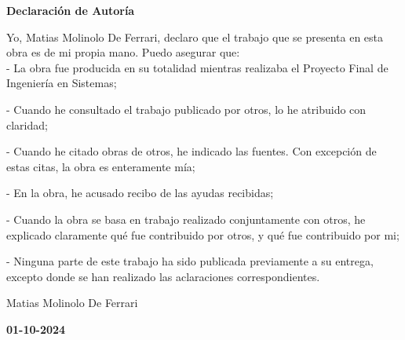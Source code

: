 {\huge\bfseries \space Declaración de Autoría}

\thispagestyle{empty}


\bigskip
\bigskip
Yo, Matias Molinolo De Ferrari, declaro que el trabajo que se presenta en esta obra es de mi propia mano. 
Puedo asegurar que:
\\

- La obra fue producida en su totalidad mientras realizaba el Proyecto Final de Ingeniería en Sistemas;


- Cuando he consultado el trabajo publicado por otros, lo he atribuido con claridad;


- Cuando he citado obras de otros, he indicado las fuentes. Con excepción de estas citas, la obra es enteramente mía;


- En la obra, he acusado recibo de las ayudas recibidas;


- Cuando la obra se basa en trabajo realizado conjuntamente con otros, he explicado claramente qué fue contribuido por otros, y qué fue contribuido por mi;


- Ninguna parte de este trabajo ha sido publicada previamente a su entrega, excepto donde se han realizado las aclaraciones correspondientes.

\bigskip
\begin{center}
\bigskip\bigskip\bigskip\bigskip\bigskip\bigskip\bigskip\bigskip
Matias Molinolo De Ferrari
\end{center}


\vspace*{\fill}

\begin{center}
\textbf{01-10-2024}%
\end{center}
\newpage
